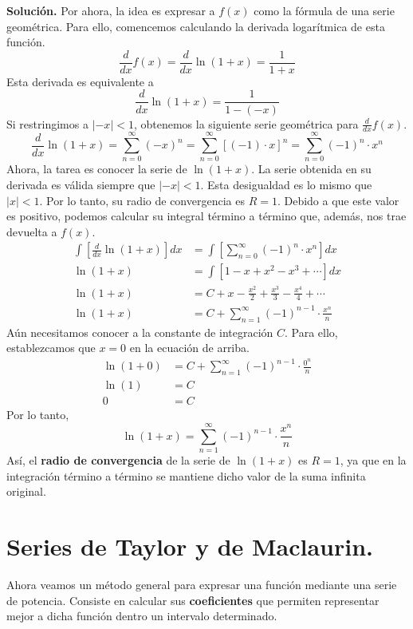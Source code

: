 \documentclass[12pt]{article}
\begin{document}
\textbf{Solución.} Por ahora, la idea es expresar a $f(x)$ como la fórmula de una serie geométrica. Para ello, comencemos calculando la derivada logarítmica de esta función.
\[
  \frac{d}{dx} f(x) = \frac{d}{dx} \ln(1 + x) = \frac{1}{1 + x}
\]
Esta derivada es equivalente a
\[
  \frac{d}{dx} \ln(1 + x) = \frac{1}{1 - (-x)}
\]
Si restringimos a $|-x| < 1$, obtenemos la siguiente serie geométrica para $\frac{d}{dx} f(x)$.
\[
  \frac{d}{dx} \ln(1 + x) = \sum_{n = 0}^{\infty} (-x)^{n}
                          = \sum_{n = 0}^{\infty} [(-1) \cdot x]^{n}
                          = \sum_{n = 0}^{\infty} (-1)^{n} \cdot x^{n}
\]
Ahora, la tarea es conocer la serie de $\ln(1 + x)$. La serie obtenida en su derivada es válida siempre que $|-x| < 1$. Esta desigualdad es lo mismo que $|x| < 1$. Por lo tanto, su radio de convergencia es $R = 1$. Debido a que este valor es positivo, podemos calcular su integral término a término que, además, nos trae devuelta a $f(x)$.
\begin{align*}
  \int \left[\frac{d}{dx} \ln(1 + x)\right] dx &= \int \left[\sum_{n = 0}^{\infty} (-1)^{n} \cdot x^{n}\right] dx \\
  \ln(1 + x) &= \int \left[1 - x + x^{2} - x^{3} + \cdots \right] dx \\
  \ln(1 + x) &= C + x - \frac{x^{2}}{2} + \frac{x^{3}}{3} - \frac{x^{4}}{4} + \cdots \\
  \ln(1 + x) &= C + \sum_{n = 1}^{\infty} (-1)^{n - 1} \cdot \frac{x^{n}}{n}
\end{align*}
Aún necesitamos conocer a la constante de integración $C$. Para ello, establezcamos que $x = 0$ en la ecuación de arriba.
\begin{align*}
  \ln(1 + 0) &= C + \sum_{n = 1}^{\infty} (-1)^{n - 1} \cdot \frac{0^{n}}{n} \\
  \ln(1) &= C \\
  0 &= C
\end{align*}
Por lo tanto,
\[
  \ln(1 + x) = \sum_{n = 1}^{\infty} (-1)^{n - 1} \cdot \frac{x^{n}}{n}
\]
Así, el \textbf{radio de convergencia} de la serie de $\ln(1 + x)$ es $R = 1$, ya que en la integración término a término se mantiene dicho valor de la suma infinita original.


\section{Series de Taylor y de Maclaurin.}

Ahora veamos un método general para expresar una función mediante una serie de potencia. Consiste en calcular sus \textbf{coeficientes} que permiten representar mejor a dicha función dentro un intervalo determinado.
\end{document}
